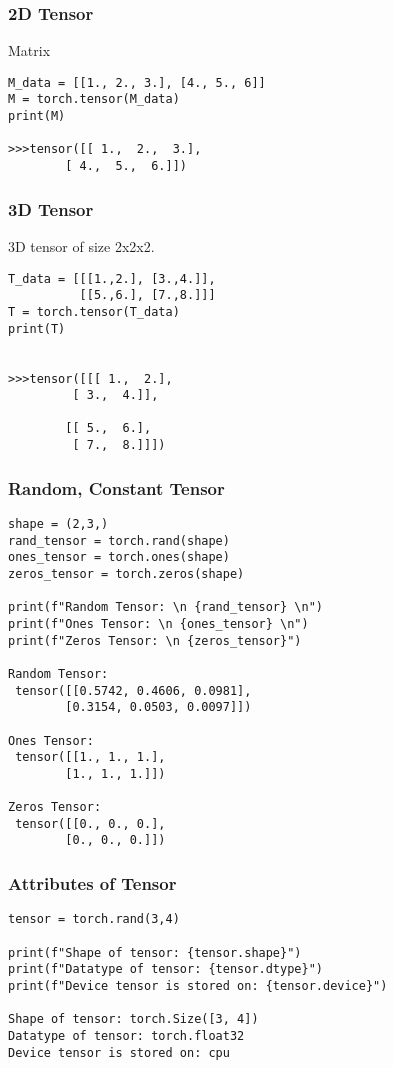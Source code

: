 
\begin{frame}[fragile]
\frametitle{2D Tensor}
Matrix 
 \begin{lstlisting}
M_data = [[1., 2., 3.], [4., 5., 6]]
M = torch.tensor(M_data)
print(M)

>>>tensor([[ 1.,  2.,  3.],
        [ 4.,  5.,  6.]])
 \end{lstlisting}

 \end{frame} 

 
\begin{frame}[fragile]
\frametitle{3D Tensor}
3D tensor of size 2x2x2.
 \begin{lstlisting}
T_data = [[[1.,2.], [3.,4.]],
          [[5.,6.], [7.,8.]]]
T = torch.tensor(T_data)
print(T)


>>>tensor([[[ 1.,  2.],
         [ 3.,  4.]],

        [[ 5.,  6.],
         [ 7.,  8.]]])
 \end{lstlisting}

 \end{frame} 
 
\begin{frame}[fragile]
\frametitle{Random, Constant Tensor}

\begin{lstlisting}
shape = (2,3,)
rand_tensor = torch.rand(shape)
ones_tensor = torch.ones(shape)
zeros_tensor = torch.zeros(shape)

print(f"Random Tensor: \n {rand_tensor} \n")
print(f"Ones Tensor: \n {ones_tensor} \n")
print(f"Zeros Tensor: \n {zeros_tensor}")

Random Tensor: 
 tensor([[0.5742, 0.4606, 0.0981],
        [0.3154, 0.0503, 0.0097]]) 

Ones Tensor: 
 tensor([[1., 1., 1.],
        [1., 1., 1.]]) 

Zeros Tensor: 
 tensor([[0., 0., 0.],
        [0., 0., 0.]])
 \end{lstlisting}

 \end{frame} 
 

\begin{frame}[fragile]
\frametitle{Attributes of Tensor}

\begin{lstlisting}
tensor = torch.rand(3,4)

print(f"Shape of tensor: {tensor.shape}")
print(f"Datatype of tensor: {tensor.dtype}")
print(f"Device tensor is stored on: {tensor.device}")

Shape of tensor: torch.Size([3, 4])
Datatype of tensor: torch.float32
Device tensor is stored on: cpu
 \end{lstlisting}

 \end{frame} 
 
